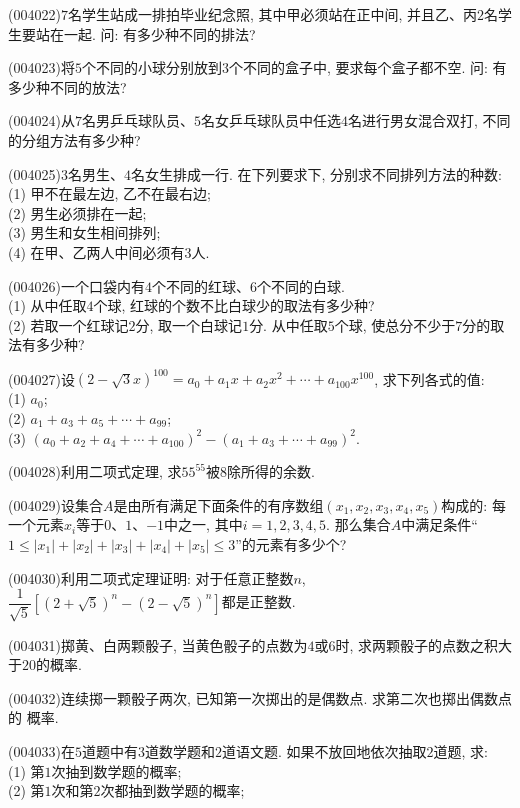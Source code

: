 \item (004022)$7$名学生站成一排拍毕业纪念照, 其中甲必须站在正中间, 并且乙、丙$2$名学生要站在一起. 问: 有多少种不同的排法?
\item (004023)将$5$个不同的小球分别放到$3$个不同的盒子中, 要求每个盒子都不空. 问: 有多少种不同的放法?
\item (004024)从$7$名男乒乓球队员、$5$名女乒乓球队员中任选$4$名进行男女混合双打, 不同的分组方法有多少种?
\item (004025)$3$名男生、$4$名女生排成一行. 在下列要求下, 分别求不同排列方法的种数:\\
(1) 甲不在最左边, 乙不在最右边;\\
(2) 男生必须排在一起;\\
(3) 男生和女生相间排列;\\
(4) 在甲、乙两人中间必须有$3$人.
\item (004026)一个口袋内有$4$个不同的红球、$6$个不同的白球.\\
(1) 从中任取$4$个球, 红球的个数不比白球少的取法有多少种?\\
(2) 若取一个红球记$2$分, 取一个白球记$1$分. 从中任取$5$个球, 使总分不少于$7$分的取法有多少种?
\item (004027)设$(2-\sqrt 3x)^{100}=a_0+a_1x+a_2x^2+\cdots+a_{100}x^{100}$, 求下列各式的值:\\
(1) $a_0$;\\
(2) $a_1+a_3+a_5+\cdots+a_{99}$;\\
(3) $(a_0+a_2+a_4+\cdots+a_{100})^2-(a_1+a_3+\cdots+a_{99})^2$.
\item (004028)利用二项式定理, 求$55^{55}$被$8$除所得的余数.
\item (004029)设集合$A$是由所有满足下面条件的有序数组$(x_1,x_2,x_3,x_4,x_5)$构成的: 每一个元素$x_i$等于$0$、$1$、$-1$中之一, 其中$i=1,2,3,4,5$. 那么集合$A$中满足条件``$1\le |x_1|+|x_2|+|x_3|+|x_4|+|x_5|\le 3$''的元素有多少个?
\item (004030)利用二项式定理证明: 对于任意正整数$n$, $\dfrac1{\sqrt 5}[(2+\sqrt 5)^n-(2-\sqrt 5)^n]$都是正整数.
\item (004031)掷黄、白两颗骰子, 当黄色骰子的点数为$4$或$6$时, 求两颗骰子的点数之积大于$20$的概率.
\item (004032)连续掷一颗骰子两次, 已知第一次掷出的是偶数点. 求第二次也掷出偶数点的
概率.
\item (004033)在$5$道题中有$3$道数学题和$2$道语文题. 如果不放回地依次抽取$2$道题, 求:\\
(1) 第$1$次抽到数学题的概率;\\
(2) 第$1$次和第$2$次都抽到数学题的概率;\\
